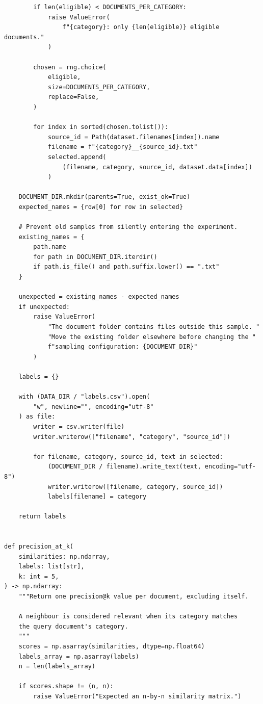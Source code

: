 \documentclass[12pt,a4paper]{report}
\theoremstyle{plain}
\theoremstyle{definition}
\theoremstyle{remark}
\theoremstyle{definition}
\begin{document}
\begin{lstlisting}
        if len(eligible) < DOCUMENTS_PER_CATEGORY:
            raise ValueError(
                f"{category}: only {len(eligible)} eligible documents."
            )

        chosen = rng.choice(
            eligible,
            size=DOCUMENTS_PER_CATEGORY,
            replace=False,
        )

        for index in sorted(chosen.tolist()):
            source_id = Path(dataset.filenames[index]).name
            filename = f"{category}__{source_id}.txt"
            selected.append(
                (filename, category, source_id, dataset.data[index])
            )

    DOCUMENT_DIR.mkdir(parents=True, exist_ok=True)
    expected_names = {row[0] for row in selected}

    # Prevent old samples from silently entering the experiment.
    existing_names = {
        path.name
        for path in DOCUMENT_DIR.iterdir()
        if path.is_file() and path.suffix.lower() == ".txt"
    }

    unexpected = existing_names - expected_names
    if unexpected:
        raise ValueError(
            "The document folder contains files outside this sample. "
            "Move the existing folder elsewhere before changing the "
            f"sampling configuration: {DOCUMENT_DIR}"
        )

    labels = {}

    with (DATA_DIR / "labels.csv").open(
        "w", newline="", encoding="utf-8"
    ) as file:
        writer = csv.writer(file)
        writer.writerow(["filename", "category", "source_id"])

        for filename, category, source_id, text in selected:
            (DOCUMENT_DIR / filename).write_text(text, encoding="utf-8")
            writer.writerow([filename, category, source_id])
            labels[filename] = category

    return labels


def precision_at_k(
    similarities: np.ndarray,
    labels: list[str],
    k: int = 5,
) -> np.ndarray:
    """Return one precision@k value per document, excluding itself.

    A neighbour is considered relevant when its category matches
    the query document's category.
    """
    scores = np.asarray(similarities, dtype=np.float64)
    labels_array = np.asarray(labels)
    n = len(labels_array)

    if scores.shape != (n, n):
        raise ValueError("Expected an n-by-n similarity matrix.")


\end{lstlisting}
\end{document}
